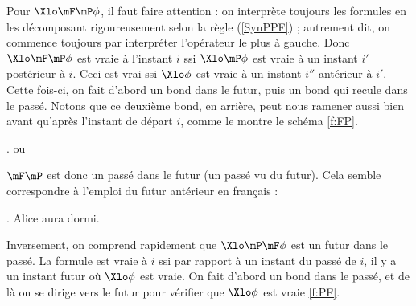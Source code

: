 Pour $\Xlo\mF\mP\phi$, il faut faire attention : on interprète toujours les formules en les décomposant rigoureusement selon la règle (\RSyn\ref{SynPPF}) ; autrement dit, on commence toujours par interpréter l'opérateur le plus à gauche. 
Donc $\Xlo\mF\mP\phi$ est vraie à l'instant $i$ ssi $\Xlo\mP\phi$ est 
vraie à un instant $i'$ postérieur à $i$.  Ceci est vrai ssi $\Xlo\phi$
est vraie à un instant $i''$ 
antérieur à $i'$.  Cette fois-ci, on fait d'abord un bond dans le futur, puis un bond qui recule dans le passé. Notons que ce deuxième bond, en arrière, peut nous ramener aussi bien avant qu'après l'instant de départ $i$, comme le montre le schéma \ref{f:FP}.

\ex.
ou\quad
{}\label{f:FP}

$\mF\mP$ est donc un passé dans le futur (un passé vu du futur). 
Cela semble correspondre à l'emploi du futur antérieur en français :

\ex. 
 Alice aura dormi.


Inversement, on comprend rapidement que $\Xlo\mP\mF\phi$ est un futur dans le passé. La formule est  vraie à $i$ ssi par
rapport à un 
instant du passé de $i$, il y a un instant futur où $\Xlo\phi$ est vraie.  
On fait d'abord un bond dans le passé, et de là on se dirige vers le futur pour vérifier que $\Xlo\phi$ est vraie \ref{f:PF}.

